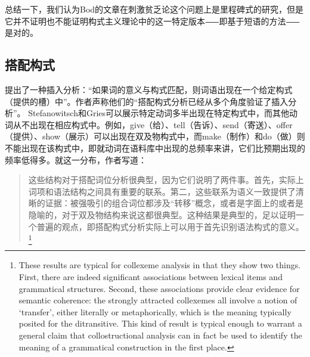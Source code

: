 \begin{exe}
\begin{xlist}[iv.]
\begin{exe}
\begin{xlist}[iv.]
总结一下，我们认为Bod的文章在刺激贫乏论这个问题上是里程碑式的研究，但是它并不证明也不能证明构式主义理论中的这一特定版本⸺即基于短语的方法⸺是对的。

\subsection{搭配构式}

\mbox{} \citet[\S~5]{SG2009a}提出了一种插入分析：“如果词的意义与构式匹配，则词语出现在一个给定构式（提供的槽）中”。作者声称他们的“搭配构式分析已经从多个角度验证了插入分析”。 Stefanowitsch和Gries可以展示特定动词多半出现在特定构式中，而其他动词从不出现在相应构式中。例如，give（给）、tell（告诉）、send（寄送）、offer（提供）、show（展示）可以出现在双及物构式中，而make（制作）和do（做）则不能出现在该构式中，即就动词在语料库中出现的总频率来讲，它们比预期出现的频率低得多。就这一分布，作者写道：
\begin{quotation}
这些结构对于搭配词位分析很典型，因为它们说明了两件事。首先，实际上词项和语法结构之间具有重要的联系。第二，这些联系为语义一致提供了清晰的证据：被强吸引的组合词位都涉及“转移”概念，或者是字面上的或者是隐喻的，对于双及物结构来说这都很典型。这种结果是典型的，足以证明一个普遍的观点，即搭配构式分析实际上可以用于首先识别语法构式的意义。\citep[]{SG2009a}\footnote{%
  These results are typical for collexeme analysis in that they show two things. First, there are
  indeed significant associations between lexical items and grammatical structures. Second, these
  associations provide clear evidence for semantic coherence: the strongly attracted collexemes all
  involve a notion of `transfer', either literally or metaphorically, which is the meaning typically
  posited for the ditransitive. This kind of result is typical enough to warrant a general claim
  that collostructional analysis can in fact be used to identify the meaning of a grammatical
  construction in the first place.
  }
\end{quotation}


\end{xlist}
\end{exe}
\end{xlist}
\end{exe}
